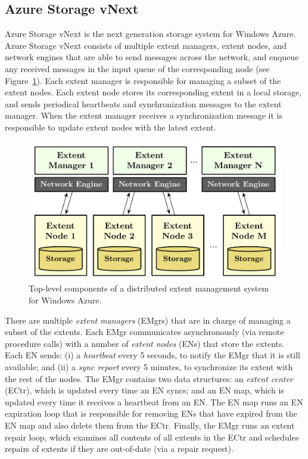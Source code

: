 \subsection{Azure Storage vNext}
\label{sec:cases:azurestore}

Azure Storage vNext is the next generation storage system for Windows Azure. Azure Storage vNext consists of multiple extent managers, extent nodes, and network engines that are able to send messages across the network, and enqueue any received messages in the input queue of the corresponding node (see Figure~\ref{fig:azurestore}). Each extent manager is responsible for managing a subset of the extent nodes. Each extent node stores its corresponding extent in a local storage, and sends periodical heartbeats and synchronization messages to the extent manager. When the extent manager receives a synchronization message it is responsible to update extent nodes with the latest extent.

\begin{figure}[t]
\centering
\includegraphics[width=\linewidth]{img/azurestore}
\caption{Top-level components of a distributed extent management system for Windows Azure.}
\label{fig:azurestore}
\end{figure}

There are multiple \emph{extent managers} (EMgrs) that are in charge of managing a subset of the extents. Each EMgr communicates asynchronously (via remote procedure calls) with a number of \emph{extent nodes} (ENs) that store the extents. Each EN sends: (i) a \emph{heartbeat} every 5 seconds, to notify the EMgr that it is still available; and (ii) a \emph{sync report} every 5 minutes, to synchronize its extent with the rest of the nodes. The EMgr contains two data structures: an \emph{extent center} (ECtr), which is updated every time an EN syncs; and an EN map, which is updated every time it receives a heartbeat from an EN. The EN map runs an EN expiration loop that is responsible for removing ENs that have expired from the EN map and also delete them from the ECtr. Finally, the EMgr runs an extent repair loop, which examines all contents of all extents in the ECtr and schedules repairs of extents if they are out-of-date (via a repair request).

